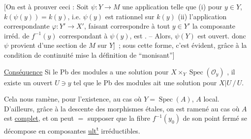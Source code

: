 [On est  à prouver ceci : Soit $\psi:Y\to M$ une application telle que (i) pour  $y\in Y$, $k(\psi(y))=k(y)$, i.e. $\psi(y)$ est rationnel sur $k(y)$ (ii) l'application correspondante $\varphi:Y'\to X'$,  faisant correspondre à tout $y\in Y'$ la composante  irréd. de $f^{-1}(y)$ correspondant à  $\psi(y)$, est . -- Alors,  $\psi(Y)$ est  ouvert.  donc $\psi$ provient d'une section de $M$ sur $Y$]~; sous cette forme, c'est évident, grâce à la condition de continuité mise  la définition de ``monisant'']

\uline{Conséquence} Si le Pb des modules a une solution pour $X\times_Y\operatorname{Spec}(\mathcal O_y)$ ,  il existe un ouvert $U\ni y$ tel que le Pb des modules ait une solution pour $X|U\,/\,U$.

Cela nous ramène, pour l'existence, au cas où  $Y=\operatorname{Spec}(A)$, $A$ local. \inserted{[Car \deleted{\unsure{tt}} alors supposons \unsure{$\dim Y=n<+\infty$}]} D'ailleurs, grâce à la descente des morphismes étales, on est ramené au cas où $A$ est \uline{complet},
et on peut $=$ supposer que la fibre $f^{-1}(y_0)$ de son point fermé se décompose en composantes \uline{ult\textsuperscript{t}} irréductibles.
